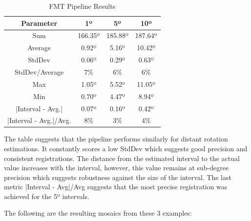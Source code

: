 \begin{table}[H]
    \centering
    \begin{tabular}{|c|c|c|c|}
        \hline
        \textbf{Parameter} & \textbf{1º} & \textbf{5º} & \textbf{10º} \\ \hline
        Sum & 166.35º & 185.88º & 187.64º \\ \hline
        Average & 0.92º & 5.16º & 10.42º \\ \hline
        StdDev & 0.06º & 0.29º & 0.63º \\ \hline
        StdDev/Average & 7\% & 6\% & 6\% \\ \hline
        Max & 1.05º & 5.52º & 11.05º \\ \hline
        Min & 0.70º & 4.47º & 8.94º \\ \hline
        |Interval - Avg.| & 0.07º & 0.16º & 0.42º \\ \hline
        |Interval - Avg.|/Avg. & 8\% & 3\% & 4\% \\ \hline
    \end{tabular}
    \caption{FMT Pipeline Results}
\end{table}

The table suggests that the pipeline performs similarly for distant rotation estimations. It constantly scores a low StdDev which suggests good precision and consistent registrations. The distance from the estimated interval to the actual value increases with the interval, however, this value remains at sub-degree precision which suggests robustness against the size of the interval. The last metric |Interval - Avg|/Avg suggests that the most precise registration was achieved for the 5º intervals.

The following are the resulting mosaics from these 3 examples:

